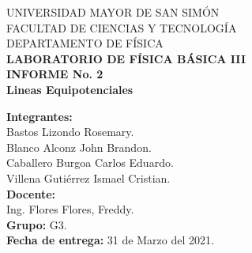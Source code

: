 \documentclass[letter,11pt]{article}
\begin{document}
\begin{titlepage}
\begin{center}
{\Large UNIVERSIDAD MAYOR DE SAN SIMÓN}\\
\vspace*{0.15cm}
{\large FACULTAD DE CIENCIAS Y TECNOLOGÍA}\\
\vspace*{0.10cm}
DEPARTAMENTO DE FÍSICA\\
\vspace*{3.0cm}
{\Large \textbf{LABORATORIO DE FÍSICA BÁSICA III}}\\
\vspace*{0.3cm}
{\Large \textbf{INFORME No. 2}}\\
\vspace*{3.5cm}
{\Large \textbf{Lineas Equipotenciales}}\\
\end{center}

\vspace*{6.2cm}
\leftskip=7.95cm
\noindent
\textbf{Integrantes:}\\
Bastos Lizondo Rosemary.\\
Blanco Alconz John Brandon.\\
Caballero Burgoa Carlos Eduardo.\\
Villena Gutiérrez Ismael Cristian.\\
\newline
\textbf{Docente:}\\
Ing. Flores Flores, Freddy.\\
\newline
\textbf{Grupo:} G3.\\
\textbf{Fecha de entrega:} 31 de Marzo del 2021.\\

\end{titlepage}
\end{document}
